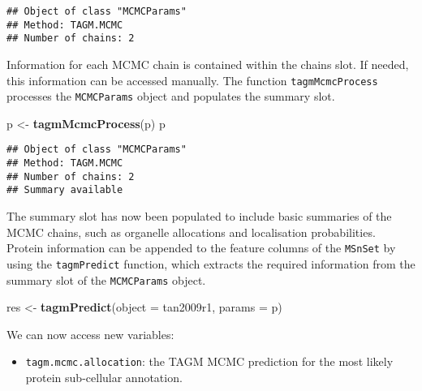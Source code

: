 \documentclass[]{article}
\newenvironment{Shaded}{\begin{snugshade}}{\end{snugshade}}
\newcommand{\KeywordTok}[1]{\textcolor[rgb]{0.13,0.29,0.53}{\textbf{{#1}}}}
\newcommand{\DataTypeTok}[1]{\textcolor[rgb]{0.13,0.29,0.53}{{#1}}}
\newcommand{\StringTok}[1]{\textcolor[rgb]{0.31,0.60,0.02}{{#1}}}
\newcommand{\NormalTok}[1]{{#1}}
\providecommand{\tightlist}{%
  \setlength{\itemsep}{0pt}\setlength{\parskip}{0pt}}
\begin{document}
\begin{verbatim}
## Object of class "MCMCParams"
## Method: TAGM.MCMC 
## Number of chains: 2
\end{verbatim}

Information for each MCMC chain is contained within the chains slot. If
needed, this information can be accessed manually. The function
\texttt{tagmMcmcProcess} processes the \texttt{MCMCParams} object and
populates the summary slot.

\begin{Shaded}
\begin{Highlighting}[]
\NormalTok{p <-}\StringTok{ }\KeywordTok{tagmMcmcProcess}\NormalTok{(p)}
\NormalTok{p}
\end{Highlighting}
\end{Shaded}

\begin{verbatim}
## Object of class "MCMCParams"
## Method: TAGM.MCMC 
## Number of chains: 2 
## Summary available
\end{verbatim}

The summary slot has now been populated to include basic summaries of
the MCMC chains, such as organelle allocations and localisation
probabilities. Protein information can be appended to the feature
columns of the \texttt{MSnSet} by using the \texttt{tagmPredict}
function, which extracts the required information from the summary slot
of the \texttt{MCMCParams} object.

\begin{Shaded}
\begin{Highlighting}[]
\NormalTok{res <-}\StringTok{ }\KeywordTok{tagmPredict}\NormalTok{(}\DataTypeTok{object =} \NormalTok{tan2009r1, }\DataTypeTok{params =} \NormalTok{p)}
\end{Highlighting}
\end{Shaded}

We can now access new variables:

\begin{itemize}
\tightlist
\item
  \texttt{tagm.mcmc.allocation}: the TAGM MCMC prediction for the most
  likely protein sub-cellular annotation.
\end{itemize}

\begin{Shaded}
\end{Shaded}
\end{document}
